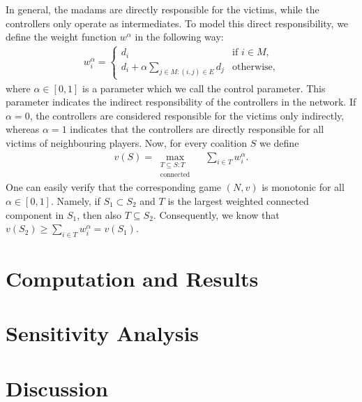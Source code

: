 \documentclass[11p]{article}
\theoremstyle{definition}
\theoremstyle{definition}
\theoremstyle{theorm}
\begin{document}
In general, the madams are directly responsible for the victims, while the controllers only operate as intermediates. To model this direct responsibility, we define the weight function $w^\alpha$ in the following way:
\begin{align*}
    w^\alpha_i = \begin{cases} d_i & \text{if $i \in M$,} \\d_i + 
    \alpha \sum_{j \in M : (i,j) \in E}d_j & \text{otherwise,}
    \end{cases}
\end{align*}
where $\alpha \in [0,1]$ is a parameter which we call the control parameter. This parameter indicates the indirect responsibility of the controllers in the network. If $\alpha = 0$, the controllers are considered responsible for the victims only indirectly, whereas $\alpha = 1$ indicates that the controllers are directly responsible for all victims of neighbouring players. Now, for every coalition $S$ we define
\begin{align*}
    v(S) = \max_{\substack{T \subseteq S : T \\ \text{connected}}}\quad \sum_{i \in T}w^\alpha_i. 
\end{align*}
One can easily verify that the corresponding game $(N, v)$ is monotonic for all $\alpha \in [0,1]$. Namely, if $S_1 \subset S_2$ and $T$ is the largest weighted connected component in $S_1$, then also $T \subseteq S_2$. Consequently, we know that $v(S_2) \geq \sum_{i \in T}w^\alpha_i = v(S_1)$.
\section{Computation and Results}

\section{Sensitivity Analysis}


\section{Discussion}
\end{document}
